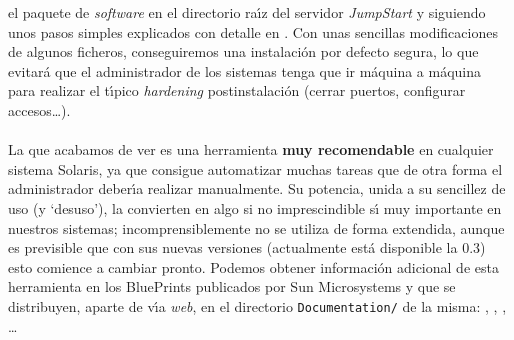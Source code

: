 el paquete de {\it software} en el directorio ra\'{\i}z del servidor {\it 
JumpStart} y siguiendo unos pasos simples explicados con detalle en 
\cite{kn:noo01c}. Con unas sencillas modificaciones de algunos ficheros, 
conseguiremos una instalaci\'on por defecto segura, lo que evitar\'a que el 
administrador de los sistemas tenga que ir m\'aquina a m\'aquina para realizar
el t\'{\i}pico {\it hardening} postinstalaci\'on (cerrar puertos, configurar
accesos\ldots).\\
\\La que acabamos de ver es una herramienta {\bf muy recomendable} en cualquier
sistema Solaris, ya que consigue automatizar muchas tareas que de otra forma
el administrador deber\'{\i}a realizar manualmente. Su potencia, unida a su
sencillez de uso (y `desuso'), la convierten en algo si no imprescindible 
s\'{\i} muy importante en nuestros sistemas; incomprensiblemente no se utiliza
de forma extendida, aunque es previsible que con sus nuevas versiones 
(actualmente est\'a disponible la 0.3) esto comience a cambiar pronto. Podemos
obtener informaci\'on adicional de esta herramienta en los BluePrints publicados
por Sun Microsystems y que se distribuyen, aparte de v\'{\i}a {\it web}, en el 
directorio {\tt Documentation/} de la misma: \cite{kn:noo01}, \cite{kn:noo01b},
\cite{kn:noo01c}, \cite{kn:noo01d}\ldots
